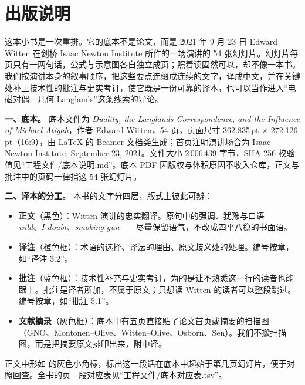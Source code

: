 \section*{出版说明}

这本小书是一次重排。它的底本不是论文，而是 2021 年 9 月 23 日 Edward Witten 在剑桥 Isaac Newton Institute 所作的一场演讲的 54 张幻灯片。幻灯片每页只有一两句话，公式与示意图各自独立成页；照着读固然可以，却不像一本书。我们按演讲本身的叙事顺序，把这些要点连缀成连续的文字，译成中文，并在关键处补上技术性的批注与史实考订，使它既是一份可靠的译本，也可以当作进入“电磁对偶—几何 Langlands”这条线索的导论。

\medskip
\noindent\textbf{一、底本。}\quad
底本文件为 \emph{Duality, the Langlands Correspondence, and the Influence of Michael Atiyah}，作者 Edward Witten，54 页，页面尺寸 362.835\,pt $\times$ 272.126\,pt（16:9），由 \LaTeX{} 的 Beamer 文档类生成；首页注明演讲场合为 Isaac Newton Institute, September 23, 2021。文件大小 2\,006\,439 字节，SHA-256 校验值见“工程文件/底本说明.md”。底本 PDF 因版权与体积原因不收入仓库，正文与批注中的页码一律指这 54 张幻灯片。

\medskip
\noindent\textbf{二、译本的分工。}\quad
本书的文字分四层，版式上彼此可辨：

\begin{itemize}
  \item \textbf{正文}（黑色）：Witten 演讲的忠实翻译。原句中的强调、犹豫与口语——\emph{wild}、\emph{I doubt}、\emph{smoking gun}——尽量保留语气，不改成四平八稳的书面语。
  \item \textbf{译注}（橙色框）：术语的选择、译法的理由、原文歧义处的处理。编号按章，如“译注 3.2”。
  \item \textbf{批注}（蓝色框）：技术性补充与史实考订，为的是让不熟悉这一行的读者也能跟上。批注是译者所加，不属于原文；只想读 Witten 的读者可以整段跳过。编号按章，如“批注 5.1”。
  \item \textbf{文献摘录}（灰色框）：底本中有五页直接贴了论文首页或摘要的扫描图（GNO、Montonen–Olive、Witten–Olive、Osborn、Sen）。我们不搬扫描图，而是把摘要原文排印出来，附中译。
\end{itemize}

正文中形如  的灰色小角标，标出这一段话在底本中起始于第几页幻灯片，便于对照回查。全书的页—段对应表见“工程文件/底本对应表.tsv”。

